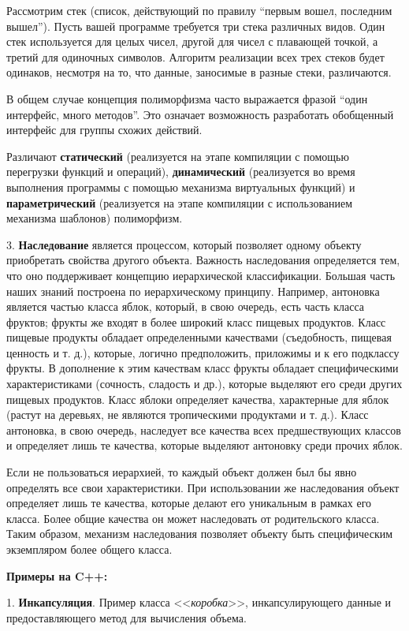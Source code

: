 Рассмотрим стек (список, действующий по правилу “первым вошел, последним вышел”). Пусть вашей программе требуется три стека различных видов. Один стек используется для целых чисел, другой для чисел с плавающей точкой, а третий для одиночных символов. Алгоритм реализации всех трех стеков будет одинаков, несмотря на то, что данные, заносимые в разные стеки, различаются. 
    
В общем случае концепция полиморфизма часто выражается фразой “один интерфейс, много методов”. Это означает возможность разработать обобщенный интерфейс для группы схожих действий.
    
Различают \textbf{статический} (реализуется на этапе компиляции с помощью перегрузки функций и операций), \textbf{динамический} (реализуется во время выполнения программы с помощью механизма виртуальных функций) и \textbf{параметрический} (реализуется на этапе компиляции с использованием механизма шаблонов) полиморфизм.
    
3. \textbf{Наследование} является процессом, который позволяет одному объекту приобретать свойства другого объекта. Важность наследования определяется тем, что оно поддерживает концепцию иерархической классификации. Большая часть наших знаний построена по иерархическому принципу. Например, антоновка является частью класса яблок, который, в свою очередь, есть часть класса фруктов; фрукты же входят в более широкий класс пищевых продуктов. Класс пищевые продукты обладает определенными качествами (съедобность, пищевая ценность и т. д.), которые, логично предположить, приложимы и к его подклассу фрукты. В дополнение к этим качествам класс фрукты обладает специфическими характеристиками (сочность, сладость и др.), которые выделяют его среди других пищевых продуктов. Класс яблоки определяет качества, характерные для яблок (растут на деревьях, не являются тропическими продуктами и т. д.). Класс антоновка, в свою очередь, наследует все качества всех предшествующих классов и определяет лишь те качества, которые выделяют антоновку среди прочих яблок.
    
Если не пользоваться иерархией, то каждый объект должен был бы явно определять все свои характеристики. При использовании же наследования объект определяет лишь те качества, которые делают его уникальным в рамках его класса. Более общие качества он может наследовать от родительского класса. Таким образом, механизм наследования позволяет объекту быть специфическим экземпляром более общего класса.

\centerline{\textbf{Примеры на C++:}}
1. \textbf{Инкапсуляция}.
Пример класса <<\textit{коробка}>>, инкапсулирующего данные и предоставляющего метод для вычисления объема.

